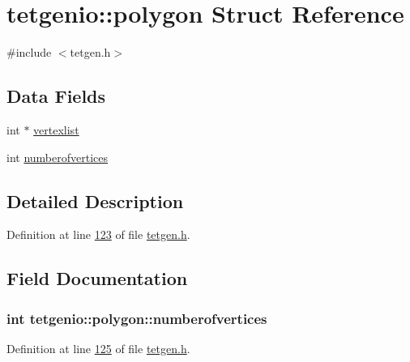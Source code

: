 \hypertarget{structtetgenio_1_1polygon}{}\section{tetgenio\+:\+:polygon Struct Reference}
\label{structtetgenio_1_1polygon}


{\ttfamily \#include $<$tetgen.\+h$>$}

\subsection*{Data Fields}
\begin{DoxyCompactItemize}
\item 
int $\ast$ \hyperlink{structtetgenio_1_1polygon_a3cc2d3756bc093db5c252dd8f42a5001}{vertexlist}
\item 
int \hyperlink{structtetgenio_1_1polygon_a019f9c62f145cf7d85227f401fcdba38}{numberofvertices}
\end{DoxyCompactItemize}


\subsection{Detailed Description}


Definition at line \hyperlink{tetgen_8h_source_l00123}{123} of file \hyperlink{tetgen_8h_source}{tetgen.\+h}.



\subsection{Field Documentation}
\subsubsection[{\texorpdfstring{numberofvertices}{numberofvertices}}]{\setlength{\rightskip}{0pt plus 5cm}int tetgenio\+::polygon\+::numberofvertices}\hypertarget{structtetgenio_1_1polygon_a019f9c62f145cf7d85227f401fcdba38}{}\label{structtetgenio_1_1polygon_a019f9c62f145cf7d85227f401fcdba38}


Definition at line \hyperlink{tetgen_8h_source_l00125}{125} of file \hyperlink{tetgen_8h_source}{tetgen.\+h}.

